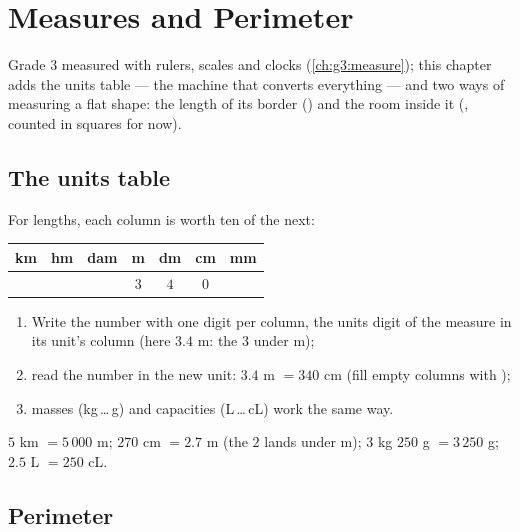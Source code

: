 \chapter{Measures and Perimeter}\label{ch:g4:measure}

Grade 3 measured with rulers, scales and clocks
(\cref{ch:g3:measure}); this chapter adds the units table --- the
machine that converts everything --- and two ways of measuring a flat
shape: the length of its border () and the room inside it
(, counted in squares for now).

\section{The units table}

\begin{method}\label{met:g4:measure:table}
For lengths, each column is worth ten of the next:
\begin{center}
\renewcommand{\arraystretch}{1.3}
\begin{tabular}{c|c|c|c|c|c|c}
km & hm & dam & m & dm & cm & mm \\
\hline
 & & & $3$ & $4$ & $0$ & \\
\end{tabular}
\end{center}
\begin{enumerate}
  \item Write the number with one digit per column, the units digit
        of the measure in its unit's column (here $3.4$ m: the $3$
        under m);
  \item read the number in the new unit: $3.4$ m $= 340$ cm (fill
        empty columns with );
  \item masses (kg\,\dots\,g) and capacities (L\,\dots\,cL) work the
        same way.
\end{enumerate}
\end{method}

\begin{example}\label{ex:g4:measure:convert}
$5$ km $= 5\,000$ m; \quad $270$ cm $= 2.7$ m (the $2$ lands under
m); \quad $3$ kg $250$ g $= 3\,250$ g; \quad
$2.5$ L $= 250$ cL.
\end{example}

\section{Perimeter}


